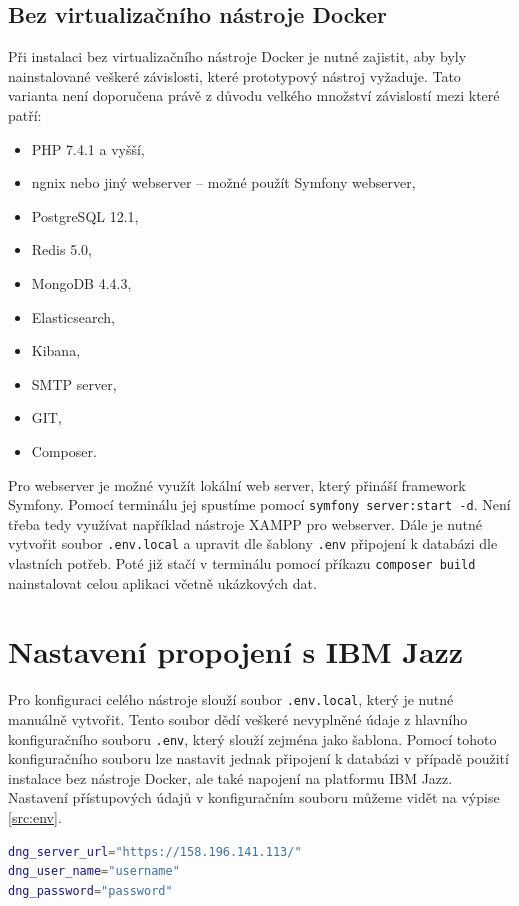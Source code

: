 \documentclass[czech,master]{diploma}
\begin{document}
\section{Bez virtualizačního nástroje Docker}
Při instalaci bez virtualizačního nástroje Docker je nutné zajistit, aby byly nainstalované veškeré závislosti, které prototypový nástroj vyžaduje. Tato varianta není doporučena právě z důvodu velkého množství závislostí mezi které patří:
\begin{itemize}
\item PHP 7.4.1 a vyšší,
\item ngnix nebo jiný webserver -- možné použít Symfony webserver,
\item PostgreSQL 12.1,
\item Redis 5.0,
\item MongoDB 4.4.3,
\item Elasticsearch,
\item Kibana,
\item SMTP server,
\item GIT,
\item Composer.
\end{itemize}

Pro webserver je možné využít lokální web server, který přináší framework Symfony. Pomocí terminálu jej spustíme pomocí \texttt{symfony server:start -d}. Není třeba tedy využívat například nástroje XAMPP pro webserver. Dále je nutné vytvořit soubor \texttt{.env.local} a upravit dle šablony \texttt{.env} připojení k databázi dle vlastních potřeb. Poté již stačí v terminálu pomocí příkazu \texttt{composer build} nainstalovat celou aplikaci včetně ukázkových dat.

\chapter{Nastavení propojení s IBM Jazz}
Pro konfiguraci celého nástroje slouží soubor \texttt{.env.local}, který je nutné manuálně vytvořit. Tento soubor dědí veškeré nevyplněné údaje z hlavního konfiguračního souboru \texttt{.env}, který slouží zejména jako šablona. Pomocí tohoto konfiguračního souboru lze nastavit jednak připojení k databázi v případě použití instalace bez nástroje Docker, ale také napojení na platformu IBM Jazz. Nastavení přístupových údajů v konfiguračním souboru můžeme vidět na výpise \ref{src:env}.


\begin{lstlisting}[language=bash,label=src:env,caption={Část konfiguračního souboru \texttt{.env.local} definující propojení s IBM Jazz}]
dng_server_url="https://158.196.141.113/"
dng_user_name="username"
dng_password="password"
\end{lstlisting}
\end{document}

